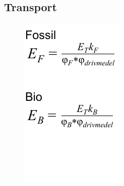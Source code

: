 \documentclass[a4paper,11pt,fleqn]{article}
\begin{document}
\subsection{Transport}
\begin{figure}[h!]
	\centering 
 		\includegraphics[scale = 0.75]{transport2.pdf}
		\label{diagram}
\end{figure}
\end{document}
